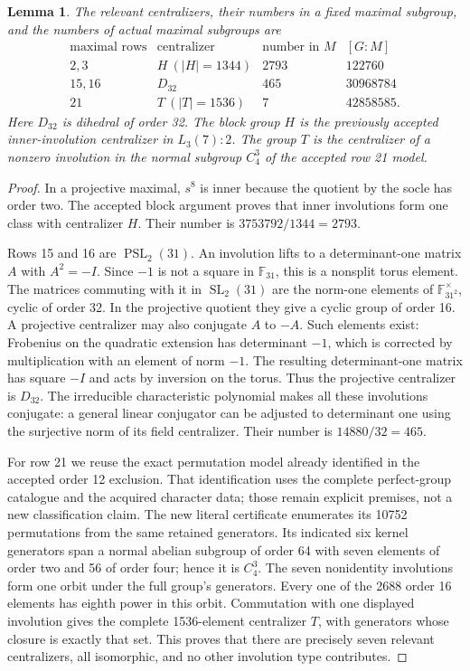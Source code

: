 \documentclass[11pt,a4paper]{article}
\newtheorem{lemma}{Lemma}\newtheorem{theorem}{Theorem}
\begin{document}
\begin{lemma}\label{centralizers}
The relevant centralizers, their numbers in a fixed maximal
subgroup, and the numbers of actual maximal subgroups are
\[
\begin{array}{c|c|r|r}
\text{maximal rows}&\text{centralizer}&\text{number in }M&[G:M]\\\hline
2,3&H\ (|H|=1344)&2793&122760\\
15,16&D_{32}&465&30968784\\
21&T\ (|T|=1536)&7&42858585.
\end{array}                                                     \tag{2}
\]
Here $D_{32}$ is dihedral of order 32. The block group $H$ is
the previously accepted inner-involution centralizer in $L_3(7):2$.
The group $T$ is the centralizer of a nonzero involution in the
normal subgroup $C_4^3$ of the accepted row 21 model.
\end{lemma}
\begin{proof}
In a projective maximal, $s^8$ is inner because the quotient by
the socle has order two. The accepted block argument proves
that inner involutions form one class with centralizer $H$.
Their number is $3753792/1344=2793$.

Rows 15 and 16 are $\operatorname{PSL}_2(31)$. An involution lifts
to a determinant-one matrix $A$ with $A^2=-I$. Since $-1$ is
not a square in $\mathbb F_{31}$, this is a nonsplit torus
element. The matrices commuting with it in $\operatorname{SL}_2(31)$
are the norm-one elements of $\mathbb F_{31^2}^\times$, cyclic of
order 32. In the projective quotient they give a cyclic group
of order 16. A projective centralizer may also conjugate $A$ to
$-A$. Such elements exist: Frobenius on the quadratic extension
has determinant $-1$, which is corrected by multiplication with
an element of norm $-1$. The resulting determinant-one matrix
has square $-I$ and acts by inversion on the torus. Thus the
projective centralizer is $D_{32}$. The irreducible characteristic
polynomial makes all these involutions conjugate: a general
linear conjugator can be adjusted to determinant one using the
surjective norm of its field centralizer. Their number is
$14880/32=465$.

For row 21 we reuse the exact permutation model already identified
in the accepted order 12 exclusion. That identification uses the
complete perfect-group catalogue and the acquired character data;
those remain explicit premises, not a new classification claim.
The new literal certificate enumerates its 10752 permutations
from the same retained generators. Its indicated six kernel
generators span a normal abelian subgroup of order 64 with
seven elements of order two and 56 of order four; hence it is
$C_4^3$. The seven nonidentity involutions form one orbit under
the full group's generators. Every one of the 2688 order 16
elements has eighth power in this orbit. Commutation with one
displayed involution gives the complete 1536-element centralizer
$T$, with generators whose closure is exactly that set.
This proves that there are precisely seven relevant centralizers,
all isomorphic, and no other involution type contributes.
\end{proof}
\end{document}
